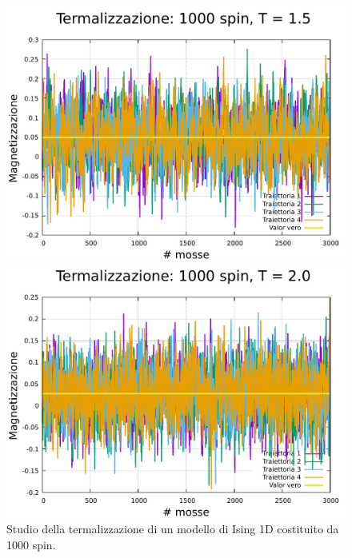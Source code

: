 \begin{figure}[htbp]
    \begin{minipage}{0.45\textwidth}  
      \centering
      \includegraphics[page=1, width=\textwidth]{Immagini/simIsing1D/magn0.02/term/term_1000_1.5.pdf}
      \caption{$T\,=\,1.5$}
    \end{minipage}\hfill
    \begin{minipage}{0.45\textwidth}  
      \centering
      \includegraphics[page=1, width=\textwidth]{Immagini/simIsing1D/magn0.02/term/term_1000_2.0.pdf}
      \caption{$T\,=\,2.0$}
    \end{minipage}
    \caption{Studio della termalizzazione di un modello di Ising 1D costituito da 1000 spin.}
\end{figure}

